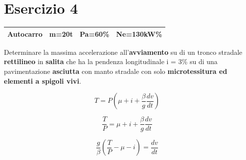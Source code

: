 \documentclass[
a4paper,
12pt, 
twoside]{scrbook}
\begin{document}
{{{{{    \section{Esercizio 4}
    \leavevmode\newline
    {
    	\centering
    	\begin{tabular}{|c|c|c|c|}
    		\hline
    		\rule[-1ex]{0pt}{2.5ex}  Autocarro & m=20t & Pa=60\% & Ne=130kW\% \\
    		\hline
    	\end{tabular}\par
    }
    
    \leavevmode\newline
    
    \begin{boxK}
    	Determinare la massima accelerazione all’\textbf{avviamento} su di un tronco stradale \textbf{rettilineo} in \textbf{salita} che ha la pendenza longitudinale i = 3\% su di una pavimentazione \textbf{asciutta} con manto stradale con solo \textbf{microtessitura ed elementi a spigoli vivi}.  
    \end{boxK}  	
    	
    \begin{equation}
    	T=P(\mu+i+\frac{\beta}{g}\frac{dv}{dt})
    \end{equation}
    
    \begin{equation}
    	\frac{T}{P}=\mu+i+\frac{\beta}{g}\frac{dv}{dt}
    \end{equation} 	
    	
    \begin{equation}
    	\frac{g}{\beta}(\frac{T}{P}-\mu-i)=\frac{dv}{dt}
    \end{equation} 		
    	
    {
    	\centering
    	
}}}}}}
\end{document}
